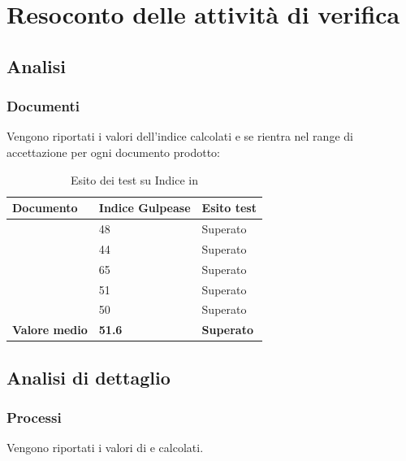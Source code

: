 \documentclass[12pt,a4paper]{article}
\begin{document}
\section{Resoconto delle attività di verifica}
	\subsection{Analisi}
	\subsubsection{Documenti}
	Vengono riportati i valori dell'indice  calcolati e se rientra nel range di accettazione per ogni documento prodotto:
	
	\begin{table}[H]
		\begin{center}
			\begin{tabular}{p{} p{0.3\textwidth} p{}}
				\toprule
				\textbf{Documento}   & \textbf{Indice Gulpease}	& \textbf{Esito test} \\ \midrule
				\midrule
				\NdP & 48 &  Superato \\ \midrule
				\SdF & 44 &  Superato \\ \midrule
				\AdR & 65 &  Superato \\ \midrule
				\PdP & 51 &  Superato \\ \midrule
				\PdQ & 50 &  Superato \\ \midrule\midrule
				\textbf{Valore medio} & \textbf{51.6}& \textbf{Superato}\\ 	
				\bottomrule
			\end{tabular}
			\caption{Esito dei test su Indice  in \FA}
		\end{center}
	\end{table}
	
	

	
	\subsection{Analisi di dettaglio}
	\subsubsection{Processi}
	Vengono riportati i valori di  e   calcolati. 
	
\end{document}
